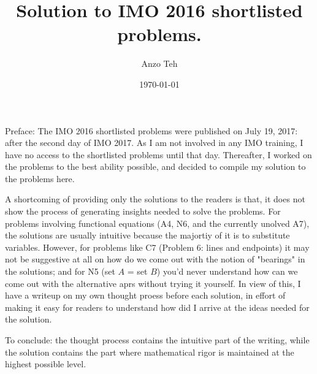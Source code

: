 \documentclass[11pt,a4paper]{article}
\begin{document}
\newcommand{\la}{\leftarrow}
\newcommand{\lra}{\leftrightarrow}


\title{Solution to IMO 2016 shortlisted problems.}
\author{Anzo Teh}
\date{\today}
\maketitle

Preface: 
The IMO 2016 shortlisted problems were published on July 19, 2017: after the second day of IMO 2017. As I am not involved in any IMO training, I have no access to the shortlisted problems until that day. Thereafter, I worked on the problems to the best ability possible, and decided to compile my solution to the problems here. 

A shortcoming of providing only the solutions to the readers is that, it does not show the process of generating insights needed to solve the problems. 
For problems involving functional equations (A4, N6, and the currently unolved A7), the solutions are usually intuitive because the majortiy of it is to substitute variables. 
However, for problems like C7 (Problem 6: lines and endpoints) it may not be suggestive at all on how do we come out with the notion of "bearings" in the solutions; and for N5 (set $A$ = set $B$) you'd never understand how can we come out with the alternative aprs without trying it yourself. 
In view of this, I have a writeup on my own thought proess before each solution, in effort of making it easy for readers to understand how did I arrive at the ideas needed for the solution. 

To conclude: the thought process contains the intuitive part of the writing, while the solution contains the part where mathematical rigor is maintained at the highest possible level. 

\newpage
\end{document}
